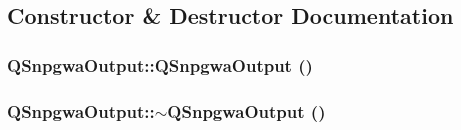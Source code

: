 \subsection{Constructor \& Destructor Documentation}
\hypertarget{classQSnpgwaOutput_aa98c99a13210b4c8f90efe61afaf1725}{
\subsubsection[{QSnpgwaOutput}]{\setlength{\rightskip}{0pt plus 5cm}QSnpgwaOutput::QSnpgwaOutput ()}}
\label{classQSnpgwaOutput_aa98c99a13210b4c8f90efe61afaf1725}
\hypertarget{classQSnpgwaOutput_a7c50b01f0631f1270add06dfb0abf8fc}{
\subsubsection[{$\sim$QSnpgwaOutput}]{\setlength{\rightskip}{0pt plus 5cm}QSnpgwaOutput::$\sim$QSnpgwaOutput ()}}
\label{classQSnpgwaOutput_a7c50b01f0631f1270add06dfb0abf8fc}



